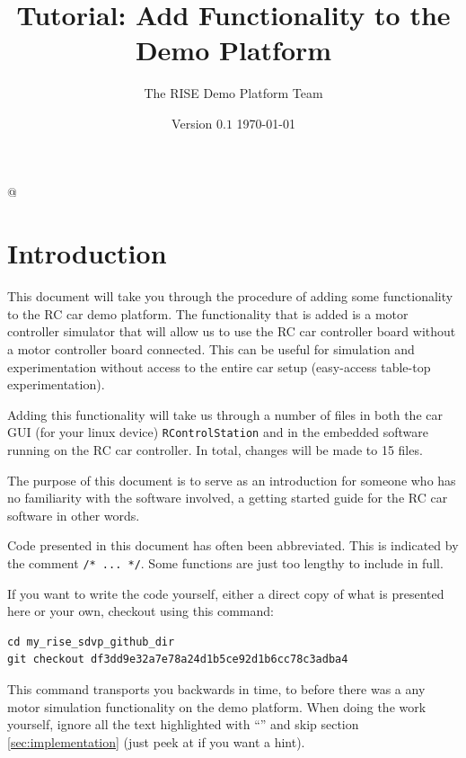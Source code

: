 \documentclass[12pt]{article} %
\newcommand{\GUIDEVERSION}[0]{$0.1$}
\newcommand{\GUIDETITLE}[0]{Tutorial: Add Functionality to the Demo Platform}
\newcommand{\change}[0]{\noindent{\hl {\b CODE CHANGE:}}}
\begin{document}
\title{\GUIDETITLE}


\author{The RISE Demo Platform Team}



\date{Version \GUIDEVERSION{} \today}




\lstMakeShortInline[]@


\maketitle


\section{Introduction}

This document will take you through the procedure of adding some
functionality to the RC car demo platform. The functionality that is
added is a motor controller simulator that will allow us to use the RC
car controller board without a motor controller board connected. This
can be useful for simulation and experimentation without access to the
entire car setup (easy-access table-top experimentation).

Adding this functionality will take us through a number of files in both
the car GUI (for your linux device) {\verb!RControlStation!} and in the
embedded software running on the RC car controller. In total, changes
will be made to 15 files.

The purpose of this document is to serve as an introduction for
someone who has no familiarity with the software involved, a getting
started guide for the RC car software in other words.

Code presented in this document has often been abbreviated. This
is indicated by the comment {\verb!/* ... */!}. Some functions are
just too lengthy to include in full.

If you want to write the code yourself, either a direct copy of what is
presented here or your own, checkout using this command:

\begin{verbatim}
cd my_rise_sdvp_github_dir
git checkout df3dd9e32a7e78a24d1b5ce92d1b6cc78c3adba4
\end{verbatim}

This command transports you backwards in time, to before there was a
any motor simulation functionality on the demo platform. When doing the
work yourself, ignore all the text highlighted with ``\change{}'' and
skip section \ref{sec:implementation} (just peek at if you want a hint).
      
\end{document}
